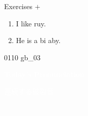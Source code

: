 \documentclass[aspectratio=169,xcolor={dvipsnames,table}]{beamer}
\begin{document}
\begin{frame}[plain]{Exercises  $+$ }
  \Large
  \begin{enumerate}
    \item<2-> I like ruy.
    \item<4-> He is a bi  aby.
  \end{enumerate}

  \hfill{\tiny 0110}\,{\scriptsize {}\,gb\_03}

\end{frame}
\begin{frame}
  \hypertarget{today}{}
  \centering
  \textcolor{white}{\Huge\bfseries Today's Pronunciation}

  \vspace{30pt}

  \textcolor{white}{\Large 連続する破裂音}

  \textcolor{white}{\Large {} $+$ }
\end{frame}
\end{document}
